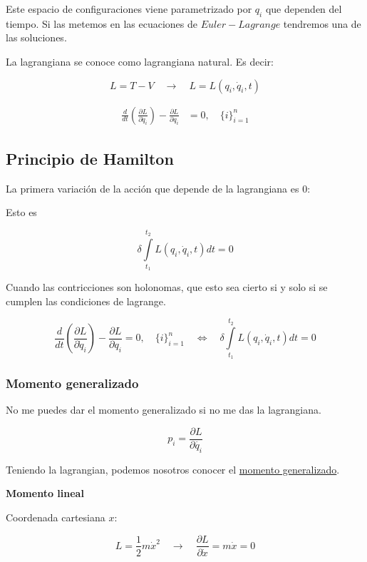 \documentclass{article}
\begin{document}
Este espacio de configuraciones viene parametrizado por $q_{i}$ que dependen del tiempo. Si las metemos en las ecuaciones de $Euler-Lagrange$ tendremos una de las soluciones.


La lagrangiana se conoce como lagrangiana natural. Es decir:

\[ L = T-V  \quad \to \quad L = L(q_{i},\dot{q}_{i},t)\]


\begin{equation}
\begin{split}
 \frac{d}{dt} \left( \frac{ \partial L }{\partial \dot{q}_{i}}  \right) - \frac{ \partial L}{\partial q_{i}} &= 0, \quad \{i\}_{i=1}^{n}
\end{split}
\end{equation}

\subsection{Principio de Hamilton}

La primera variación de la acción que depende de la lagrangiana es $0$:

Esto es 


\[ \delta \int\limits_{t_{1}}^{t_{2}} L( q_{i}, \dot{q}_{i}, t )dt =0  \]

Cuando las contricciones son holonomas, que esto sea cierto si y solo si se cumplen las condiciones de lagrange.

\[   \frac{d}{dt} \left( \frac{ \partial L }{\partial \dot{q}_{i}}  \right) - \frac{ \partial L}{\partial q_{i}} = 0, \quad \{i\}_{i=1}^{n} \quad \Longleftrightarrow \quad \delta \int\limits_{t_{1}}^{t_{2}} L( q_{i}, \dot{q}_{i}, t )dt =0   \]


\subsubsection{Momento generalizado}

No me puedes dar el momento generalizado si no me das la lagrangiana.

\[  \boxed{  p_{i} = \frac{\partial L}{\partial \dot{q_{i}}}    } \]

Teniendo la lagrangian, podemos nosotros conocer el \underline{momento generalizado}.

\textbf{Momento lineal}

Coordenada cartesiana $x$:


\[ L = \frac{1}{2}m\dot{x}^{2} \quad \to \quad \frac{\partial L}{\partial \dot{x}} = m\dot{x}=0  \]
\end{document}
